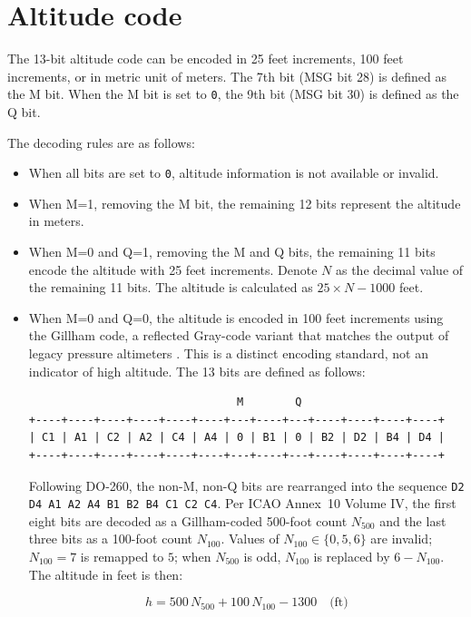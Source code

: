 


\section{Altitude code} \label{sec:alt_code}

The 13-bit altitude code can be encoded in 25 feet increments, 100 feet increments, or in metric unit of meters. The 7th bit (MSG bit 28) is defined as the M bit. When the M bit is set to \texttt{0}, the 9th bit (MSG bit 30) is defined as the Q bit.

The decoding rules are as follows:

\begin{itemize}
  \item When all bits are set to \texttt{0}, altitude information is not available or invalid.

  \item When M=1, removing the M bit, the remaining 12 bits represent the altitude in meters.

  \item When M=0 and Q=1, removing the M and Q bits, the remaining 11 bits encode the altitude with 25 feet increments. Denote $N$ as the decimal value of the remaining 11 bits. The altitude is calculated as $25 \times N - 1000$ feet.

  \item When M=0 and Q=0, the altitude is encoded in 100 feet increments using the Gillham code, a reflected Gray-code variant that matches the output of legacy pressure altimeters \cite{icaoA10V4}. This is a distinct encoding standard, not an indicator of high altitude. The 13 bits are defined as follows:

\begin{verbatim}
                                M        Q
+----+----+----+----+----+----+---+----+---+----+----+----+----+
| C1 | A1 | C2 | A2 | C4 | A4 | 0 | B1 | 0 | B2 | D2 | B4 | D4 |
+----+----+----+----+----+----+---+----+---+----+----+----+----+
\end{verbatim}

  Following DO-260, the non-M, non-Q bits are rearranged into the sequence \texttt{D2 D4 A1 A2 A4 B1 B2 B4 C1 C2 C4}. Per ICAO Annex~10 Volume IV, the first eight bits are decoded as a Gillham-coded 500-foot count $N_{500}$ and the last three bits as a 100-foot count $N_{100}$. Values of $N_{100} \in \{0, 5, 6\}$ are invalid; $N_{100}=7$ is remapped to $5$; when $N_{500}$ is odd, $N_{100}$ is replaced by $6 - N_{100}$. The altitude in feet is then:

\begin{equation}
  h = 500 \, N_{500} + 100 \, N_{100} - 1300 \quad \text{(ft)}
\end{equation}

\end{itemize}

